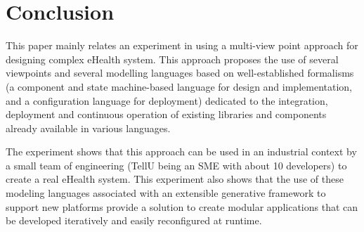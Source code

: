 \section{Conclusion}

This paper mainly relates an experiment in using a multi-view point approach for designing complex eHealth system. This approach proposes the use of several viewpoints and several modelling languages based on well-established formalisms (a component and state machine-based language for design and implementation, and a configuration language for deployment) dedicated to the integration, deployment and continuous operation of existing libraries and components already available in various languages. 

The experiment shows that this approach can be used in an industrial context by a small team of engineering (TellU being an SME with about 10 developers) to create a real eHealth system. This experiment also shows that the use of these modeling languages associated with an extensible generative framework to support new platforms provide a solution to create modular applications that can be developed iteratively and easily reconfigured at runtime. 

